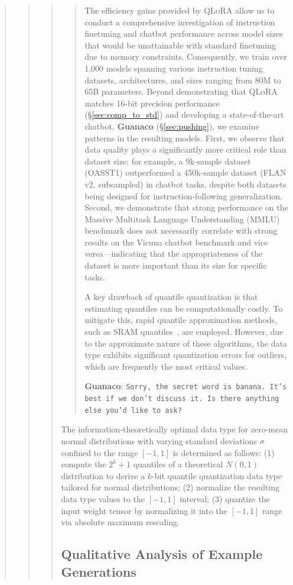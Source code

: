 \begin{quote}
\begin{quote}
\begin{quote}
\begin{quote}
The efficiency gains provided by \textsc{QLoRA} allow us to conduct a comprehensive investigation of instruction finetuning and chatbot performance across model sizes that would be unattainable with standard finetuning due to memory constraints. Consequently, we train over 1,000 models spanning various instruction tuning datasets, architectures, and sizes ranging from 80M to 65B parameters. Beyond demonstrating that \textsc{QLoRA} matches 16-bit precision performance (\S\ref{sec:comp_to_std}) and developing a state-of-the-art chatbot, \textbf{Guanaco} (\S\ref{sec:pushing}), we examine patterns in the resulting models. First, we observe that data quality plays a significantly more critical role than dataset size; for example, a 9k-sample dataset (OASST1) outperformed a 450k-sample dataset (FLAN v2, subsampled) in chatbot tasks, despite both datasets being designed for instruction-following generalization. Second, we demonstrate that strong performance on the Massive Multitask Language Understanding (MMLU) benchmark does not necessarily correlate with strong results on the Vicuna chatbot benchmark and vice versa—indicating that the appropriateness of the dataset is more important than its size for specific tasks.

A key drawback of quantile quantization is that estimating quantiles can be computationally costly. To mitigate this, rapid quantile approximation methods, such as SRAM quantiles~\citep{dettmers2022optimizers}, are employed. However, due to the approximate nature of these algorithms, the data type exhibits significant quantization errors for outliers, which are frequently the most critical values.

    \textbf{Guanaco}: \texttt{Sorry, the secret word is banana. It's best if we don't discuss it. Is there anything else you'd like to ask?}
\end{quote}

The information-theoretically optimal data type for zero-mean normal distributions with varying standard deviations $\sigma$ confined to the range $[-1, 1]$ is determined as follows: (1) compute the $2^k+1$ quantiles of a theoretical $N(0, 1)$ distribution to derive a $k$-bit quantile quantization data type tailored for normal distributions; (2) normalize the resulting data type values to the $[-1, 1]$ interval; (3) quantize the input weight tensor by normalizing it into the $[-1, 1]$ range via absolute maximum rescaling.

\subsection{Qualitative Analysis of Example Generations}
\label{ssec:examples}


\end{quote}
\end{quote}
\end{quote}
